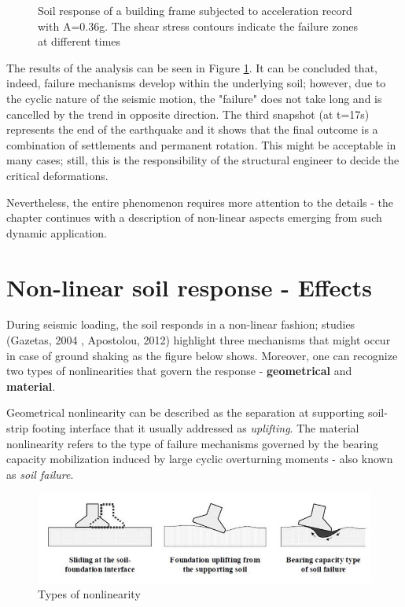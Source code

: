 \documentclass[12pt,a4paper]{report}
\begin{document}
\begin{figure}[!h]
\begin{minipage}[b]{0.45\textwidth}
   		\caption{Soil response of a building frame subjected to acceleration record with A=0.36g. The shear stress contours indicate the failure zones at different times}
   		\label{new4}
   	\end{minipage}
   \end{figure} 
  
 The results of the analysis can be seen in Figure \ref{new4}. It can be concluded that, indeed, failure mechanisms develop within the underlying soil; however, due to the cyclic nature of the seismic motion, the "failure" does not take long and is cancelled by the trend in opposite direction. The third snapshot (at t=17s) represents the end of the earthquake and it shows that the final outcome is a combination of settlements and permanent rotation. This might be acceptable in many cases; still, this is the responsibility of the structural engineer to decide the critical deformations.
 
 
 Nevertheless, the entire phenomenon requires more attention to the details - the chapter continues with a description of non-linear aspects emerging from such dynamic application.
  
  \newpage
\section{Non-linear soil response - Effects}
During seismic loading, the soil responds in a non-linear fashion; studies (Gazetas, 2004 \cite{gazetas2004nonlinear}, Apostolou, 2012\cite{apostolou2011soil}) highlight three mechanisms that might occur in case of ground shaking as the figure below shows. Moreover, one can recognize two types of nonlinearities that govern the response - \textbf{geometrical} and \textbf{material}.

Geometrical nonlinearity can be described as the separation at supporting soil-strip footing interface that it usually addressed as \textit{uplifting}. The material nonlinearity refers to the type of failure mechanisms governed by the bearing capacity mobilization induced by large cyclic overturning moments - also known as \textit{soil failure}. 

\begin{figure}[h!]
	\centering
	\includegraphics[width=0.7\linewidth]{"nonlin"}
	\caption{Types of nonlinearity}
	\label{types}
\end{figure}
\end{document}
